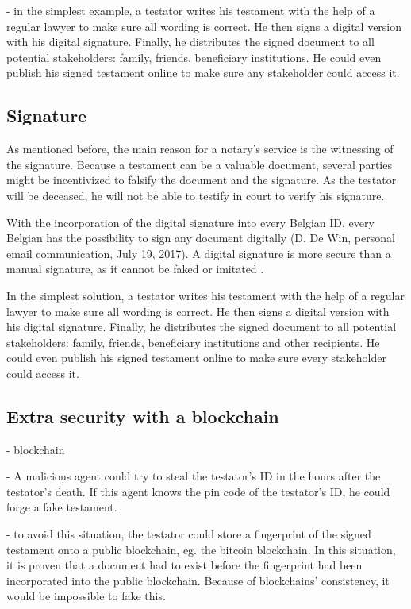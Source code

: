 - in the simplest example, a testator writes his testament with the help of a regular lawyer to make sure all wording is correct. He then signs a digital version with his digital signature. Finally, he distributes the signed document to all potential stakeholders: family, friends, beneficiary institutions. He could even publish his signed testament online to make sure any stakeholder could access it.
\fi

\subsection{Signature}

 As mentioned before, the main reason for a notary's service is the witnessing of the signature. Because a testament can be a valuable document, several parties might be incentivized to falsify the document and the signature. As the testator will be deceased, he will not be able to testify in court to verify his signature.

 With the incorporation of the digital signature into every Belgian ID, every Belgian has the possibility to sign any document digitally (D. De Win, personal email communication, July 19, 2017). A digital signature is more secure than a manual signature, as it cannot be faked or imitated \cite{belgian-eid}. 

 In the simplest solution, a testator writes his testament with the help of a regular lawyer to make sure all wording is correct. He then signs a digital version with his digital signature. Finally, he distributes the signed document to all potential stakeholders: family, friends, beneficiary institutions and other recipients. He could even publish his signed testament online to make sure every stakeholder could access it.


\subsection{Extra security with a blockchain}

\iffalse
- blockchain

- A malicious agent could try to steal the testator's ID in the hours after the testator's death. If this agent knows the pin code of the testator's ID, he could forge a fake testament.

- to avoid this situation, the testator could store a fingerprint of the signed testament onto a public blockchain, eg. the bitcoin blockchain. In this situation, it is proven that a document had to exist before the fingerprint had been incorporated into the public blockchain. Because of blockchains' consistency, it would be impossible to fake this.

